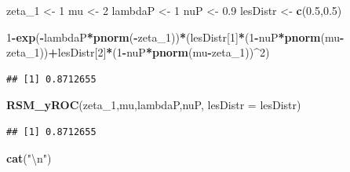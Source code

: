 \documentclass[
]{book}
\newenvironment{Shaded}{\begin{snugshade}}{\end{snugshade}}
\newcommand{\CharTok}[1]{\textcolor[rgb]{0.31,0.60,0.02}{#1}}
\newcommand{\DataTypeTok}[1]{\textcolor[rgb]{0.13,0.29,0.53}{#1}}
\newcommand{\DecValTok}[1]{\textcolor[rgb]{0.00,0.00,0.81}{#1}}
\newcommand{\FloatTok}[1]{\textcolor[rgb]{0.00,0.00,0.81}{#1}}
\newcommand{\KeywordTok}[1]{\textcolor[rgb]{0.13,0.29,0.53}{\textbf{#1}}}
\newcommand{\NormalTok}[1]{#1}
\newcommand{\OperatorTok}[1]{\textcolor[rgb]{0.81,0.36,0.00}{\textbf{#1}}}
\newcommand{\StringTok}[1]{\textcolor[rgb]{0.31,0.60,0.02}{#1}}
\begin{document}
\begin{Shaded}
\begin{Highlighting}[]
\NormalTok{zeta_}\DecValTok{1}\NormalTok{ <-}\StringTok{ }\DecValTok{1}
\NormalTok{mu <-}\StringTok{ }\DecValTok{2}
\NormalTok{lambdaP <-}\StringTok{ }\DecValTok{1}
\NormalTok{nuP <-}\StringTok{ }\FloatTok{0.9}
\NormalTok{lesDistr <-}\StringTok{ }\KeywordTok{c}\NormalTok{(}\FloatTok{0.5}\NormalTok{,}\FloatTok{0.5}\NormalTok{)}

\DecValTok{1}\OperatorTok{-}\KeywordTok{exp}\NormalTok{(}\OperatorTok{-}\NormalTok{lambdaP}\OperatorTok{*}\KeywordTok{pnorm}\NormalTok{(}\OperatorTok{-}\NormalTok{zeta_}\DecValTok{1}\NormalTok{))}\OperatorTok{*}\NormalTok{(lesDistr[}\DecValTok{1}\NormalTok{]}\OperatorTok{*}\NormalTok{(}\DecValTok{1}\OperatorTok{-}\NormalTok{nuP}\OperatorTok{*}\KeywordTok{pnorm}\NormalTok{(mu}\OperatorTok{-}\NormalTok{zeta_}\DecValTok{1}\NormalTok{))}\OperatorTok{+}\NormalTok{lesDistr[}\DecValTok{2}\NormalTok{]}\OperatorTok{*}\NormalTok{(}\DecValTok{1}\OperatorTok{-}\NormalTok{nuP}\OperatorTok{*}\KeywordTok{pnorm}\NormalTok{(mu}\OperatorTok{-}\NormalTok{zeta_}\DecValTok{1}\NormalTok{))}\OperatorTok{^}\DecValTok{2}\NormalTok{)}
\end{Highlighting}
\end{Shaded}

\begin{verbatim}
## [1] 0.8712655
\end{verbatim}

\begin{Shaded}
\begin{Highlighting}[]
\KeywordTok{RSM_yROC}\NormalTok{(zeta_}\DecValTok{1}\NormalTok{,mu,lambdaP,nuP, }\DataTypeTok{lesDistr =}\NormalTok{ lesDistr)}
\end{Highlighting}
\end{Shaded}

\begin{verbatim}
## [1] 0.8712655
\end{verbatim}

\begin{Shaded}
\begin{Highlighting}[]
\KeywordTok{cat}\NormalTok{(}\StringTok{"}\CharTok{\textbackslash{}n}\StringTok{"}\NormalTok{)}
\end{Highlighting}
\end{Shaded}
\end{document}
